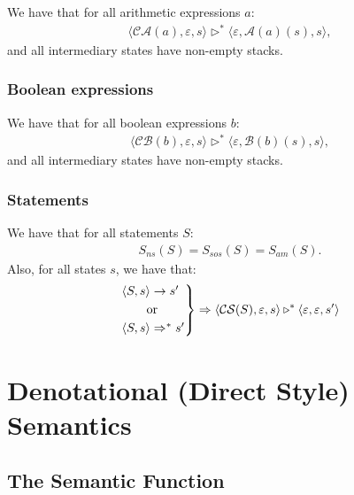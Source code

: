 \documentclass[a4paper, 12pt, twoside]{article}
\begin{document}
We have that for all arithmetic expressions $a$: \begin{gather*}
  \langle \mathcal{CA}(a), \varepsilon, s \rangle 
  \triangleright^*
  \langle \varepsilon, \mathcal{A}(a)(s), s \rangle,
\end{gather*} and all intermediary states have non-empty stacks.

\subsubsection{Boolean expressions}

We have that for all boolean expressions $b$: \begin{gather*}
  \langle \mathcal{CB}(b), \varepsilon, s \rangle 
  \triangleright^*
  \langle \varepsilon, \mathcal{B}(b)(s), s \rangle,
\end{gather*} and all intermediary states have non-empty stacks.

\subsubsection{Statements}

We have that for all statements $S$: \begin{gather*}
  S_{ns}(S) = S_{sos}(S) = S_{am}(S).
\end{gather*} Also, for all states $s$, we have that: \begin{gather*}
  \begin{rcases*}
    \langle S, s \rangle \to s' \\
    \qquad \text{or} \\
    \langle S, s \rangle \Rightarrow^* s'
  \end{rcases*} \Rightarrow
  \langle \mathcal{CS}(S), \varepsilon, s \rangle \triangleright^* 
  \langle \varepsilon, \varepsilon, s' \rangle 
\end{gather*}

\section{Denotational (Direct Style) Semantics}

\subsection{The Semantic Function} 
\end{document}
